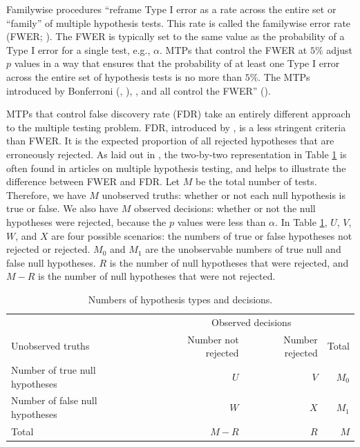 \documentclass[
]{jss}
\begin{document}
Familywise procedures ``reframe Type I error as a rate across the entire
set or ``family'' of multiple hypothesis tests. This rate is called the
familywise error rate (FWER; \citet{RN33098}). The FWER is typically set
to the same value as the probability of a Type I error for a single
test, e.g., \(\alpha\). MTPs that control the FWER at \(5\%\) adjust
\(p\) values in a way that ensures that the probability of at least one
Type I error across the entire set of hypothesis tests is no more than
\(5\%\). The MTPs introduced by Bonferroni (\citet{RN24280},
\citet{RN24281}), \citet{RN24282}, and \citet{RN28696} all control the
FWER'' (\citet{Porter2018}).

MTPs that control false discovery rate (FDR) take an entirely different
approach to the multiple testing problem. FDR, introduced by
\citet{BenjaminiHochberg1995}, is a less stringent criteria than FWER.
It is the expected proportion of all rejected hypotheses that are
erroneously rejected. As laid out in \citet{Porter2018}, the two-by-two
representation in Table \ref{tab:twobytwo} is often found in articles on
multiple hypothesis testing, and helps to illustrate the difference
between FWER and FDR. Let \(M\) be the total number of tests. Therefore,
we have \(M\) unobserved truths: whether or not each null hypothesis is
true or false. We also have \(M\) observed decisions: whether or not the
null hypotheses were rejected, because the \(p\) values were less than
\(\alpha\). In Table \ref{tab:twobytwo}, \(U\), \(V\), \(W\), and \(X\)
are four possible scenarios: the numbers of true or false hypotheses not
rejected or rejected. \(M_0\) and \(M_1\) are the unobservable numbers
of true null and false null hypotheses. \(R\) is the number of null
hypotheses that were rejected, and \(M - R\) is the number of null
hypotheses that were not rejected.

\begin{table}[h!]
\centering
\begin{tabular}{l r r r}
\toprule
                                      & \multicolumn{3}{c}{Observed decisions}\\
Unobserved truths                     & Number not rejected     & Number rejected   & Total \\ \midrule
Number of true null hypotheses        & $U$                     & $V$               & $M_0$ \\
Number of false null hypotheses       & $W$                     & $X$               & $M_1$ \\ \hline
Total                                 & $M-R$                   & $R$               & $M$ \\
\bottomrule
\end{tabular}
\caption{Numbers of hypothesis types and decisions.}
  \label{tab:twobytwo}
\end{table}
\end{document}
